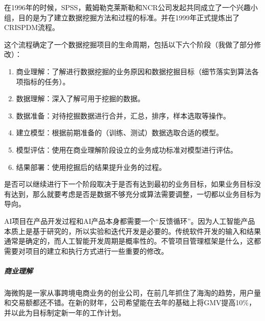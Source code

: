 \documentclass[letterpaper,10pt,english]{sphinxmanual}
\begin{document}
\begin{center}\end{center} 

在1996年的时候，SPSS，戴姆勒\sphinxhyphen{}克莱斯勒和NCR公司发起共同成立了一个兴趣小组，目的是为了建立数据挖掘方法和过程的标准。并在1999年正式提炼出了CRISP\sphinxhyphen{}DM流程。

这个流程确定了一个数据挖掘项目的生命周期，包括以下六个阶段（我做了部分修改）：
\begin{enumerate}
%
\item {} 
商业理解：了解进行数据挖掘的业务原因和数据挖掘目标（细节落实到算法各项指标的任务）。

\item {} 
数据理解：深入了解可用于挖掘的数据。

\item {} 
数据准备：对待挖掘数据进行合并，汇总，排序，样本选取等操作。

\item {} 
建立模型：根据前期准备的（训练、测试）数据选取合适的模型。

\item {} 
模型评估：使用在商业理解阶段设立的业务成功标准对模型进行评估。

\item {} 
结果部署：使用挖掘后的结果提升业务的过程。

\end{enumerate}

是否可以继续进行下一个阶段取决于是否有达到最初的业务目标，如果业务目标没有达到，那么就要考虑是否是数据不够充分或算法需要调整，一切都以业务目标为导向。

AI项目在产品开发过程和AI产品本身都需要一个“反馈循环”。因为人工智能产品本质上是基于研究的，所以实验和迭代开发是必要的。传统软件开发的输入和结果通常是确定的，而人工智能开发周期是概率性的。不管项目管理框架是什么，这都需要对项目的建立和执行方式进行一些重要的修改。%
\begin{footnote}[800]\sphinxAtStartFootnote
{}
%
\end{footnote}


\subparagraph{商业理解}
\label{\detokenize{chapter_project/process:id14}}
海微购是一家从事跨境电商业务的创业公司，在前几年抓住了海淘的趋势，用户量和交易额都还不错。在新的财年，公司希望能在去年的基础上将GMV提高10\%，并以此为目标制定新一年的工作计划。
\end{document}
